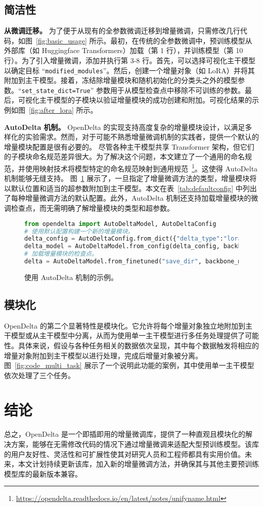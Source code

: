 \subsection{简洁性}

\textbf{从微调迁移。} 为了便于从现有的全参数微调迁移到增量微调，只需修改几行代码，如图~\ref{fig:basic_usage} 所示。最初，在传统的全参数微调中，预训练模型从外部库（如 Huggingface Transformers）加载（第 1 行），并训练模型（第 10 行）。为了引入增量微调，添加并执行第 3-8 行。首先，可以选择可视化主干模型以确定目标 ``\texttt{modified\_modules}''。然后，创建一个增量对象（如 LoRA）并将其附加到主干模型。接着，冻结除增量模块和随机初始化的分类头之外的模型参数。``\texttt{set\_state\_dict=True}'' 参数用于从模型检查点中移除不可训练的参数。最后，可视化主干模型的子模块以验证增量模块的成功创建和附加。可视化结果的示例如图~\ref{fig:after_lora} 所示。

\textbf{AutoDelta 机制。} OpenDelta 的实现支持高度复杂的增量模块设计，以满足多样化的实验需求。然而，对于可能不熟悉增量微调机制的实践者，提供一个默认的增量模块配置是很有必要的。
尽管各种主干模型共享 Transformer 架构，但它们的子模块命名规范差异很大。为了解决这个问题，本文建立了一个通用的命名规范，并使用映射技术将模型特定的命名规范映射到通用规范~\footnote{\url{https://opendelta.readthedocs.io/en/latest/notes/unifyname.html}}。这使得 AutoDelta 机制能够无缝支持。
图~\ref{fig:autodelta} 展示了，一旦指定了增量微调方法的类型，增量模块将以默认位置和适当的超参数附加到主干模型。本文在表~\ref{tab:defaultconfig} 中列出了每种增量微调方法的默认配置。此外，AutoDelta 机制还支持加载增量模块的微调检查点，而无需明确了解增量模块的类型和超参数。

\begin{figure}[hbt!]
\centering
\begin{minipage}{0.94\linewidth}
\begin{lstlisting}[language=Python]
from opendelta import AutoDeltaModel, AutoDeltaConfig
# 使用默认配置构建一个新的增量模块。
delta_config = AutoDeltaConfig.from_dict({"delta_type":"lora"})
delta_model = AutoDeltaModel.from_config(delta_config, backbone_model)
# 加载增量模块的检查点。
delta = AutoDeltaModel.from_finetuned("save_dir", backbone_model)
\end{lstlisting}
\end{minipage}
\caption{使用 AutoDelta 机制的示例。}
\label{fig:autodelta}
\end{figure}

\subsection{模块化}
OpenDelta 的第二个显著特性是模块化。它允许将每个增量对象独立地附加到主干模型或从主干模型中分离，从而为使用单一主干模型进行多任务处理提供了可能性。具体来说，假设与各种任务相关的数据依次呈现，其中每个数据触发将相应的增量对象附加到主干模型以进行处理，完成后增量对象被分离。图~\ref{fig:code_multi_task} 展示了一个说明此功能的案例，其中使用单一主干模型依次处理了三个任务。


\section{结论}
总之，OpenDelta 是一个即插即用的增量微调库，提供了一种直观且模块化的解决方案，能够在无需修改代码的情况下通过增量微调来适配大型预训练模型。该库的用户友好性、灵活性和可扩展性使其对研究人员和工程师都具有实用价值。未来，本文计划持续更新该库，加入新的增量微调方法，并确保其与其他主要预训练模型库的最新版本兼容。